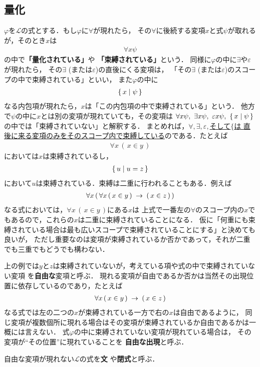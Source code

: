 \subsection{量化}
	$\varphi$を$\mathcal{L}$の式とする．もし$\varphi$に$\forall$が現れたら，
	その$\forall$に後続する変項$x$と式$\psi$が取れるが，そのとき$x$は
	\begin{align}
		\forall x \psi
	\end{align}
	の中で{\bf 「量化されている」}や
	{\bf 「束縛されている」}という．
	同様に$\varphi$の中に$\exists$や$\varepsilon$が現れたら，
	その$\exists$ (または$\varepsilon$)の直後にくる変項は，
	「その$\exists$ (または$\varepsilon$)のスコープの中で束縛されている」といい，
	また$\varphi$の中に
	\begin{align}
		\{\, x \mid \psi\, \}
	\end{align}
	なる内包項が現れたら，$x$は「この内包項の中で束縛されている」という．
	他方で$\psi$の中に$x$とは別の変項が現れていても，その変項は
	$\forall x \psi,\ \exists x \psi,\ \varepsilon x \psi,\ \{\, x \mid \psi\, \}$
	の中では「束縛されていない」と解釈する．
	まとめれば，\underline{$\forall,\exists,\varepsilon,$そして$\{$は
	直後に来る変項のみをそのスコープ内で束縛している}のである．たとえば
	\begin{align}
		\forall x\, (\, x \in y\, )
	\end{align}
	においては$x$は束縛されているし，
	\begin{align}
		\{\, u \mid u = z\, \}
	\end{align}
	において$u$は束縛されている．束縛は二重に行われることもある．例えば
	\begin{align}
		\forall x\, (\, \forall x\, (\, x \in y\, ) \hspace{0.25em}\rightarrow\hspace{0.25em} (\, x \in z\, )\, )
	\end{align}
	なる式においては，$\forall x\, (\, x \in y\, )$にある$x$は
	上式で一番左の$\forall$のスコープ内の$x$でもあるので，これらの$x$は二重に束縛されていることになる．
	仮に「何重にも束縛されている場合は最も広いスコープで束縛されていることにする」と決めても良いが，
	ただし重要なのは変項が束縛されているか否かであって，それが二重でも三重でもどうでも構わない．
	
	上の例では$y$と$z$は束縛されていないが，考えている項や式の中で束縛されていない変項
	を{\bf 自由な}変項と呼ぶ．
	現れる変項が自由であるか否かは当然その出現位置に依存しているのであり，たとえば
	\begin{align}
		\forall x\, (\, x \in y\, ) \hspace{0.25em}\rightarrow\hspace{0.25em} (\, x \in z\, )
	\end{align}
	なる式では左の二つの$x$が束縛されている一方で右の$x$は自由であるように，
	同じ変項が複数個所に現れる場合はその変項が束縛されているか自由であるかは一概には言えない．
	式$\varphi$の中に束縛されていない変項が現れている場合は，
	その変項が``その位置''に現れていることを
	{\bf 自由な出現}と呼ぶ．
	
	\begin{screen}
		\begin{metadfn}[文]
			自由な変項が現れない$\mathcal{L}$の式を{\bf 文}
			や{\bf 閉式}と呼ぶ．
		\end{metadfn}
	\end{screen}